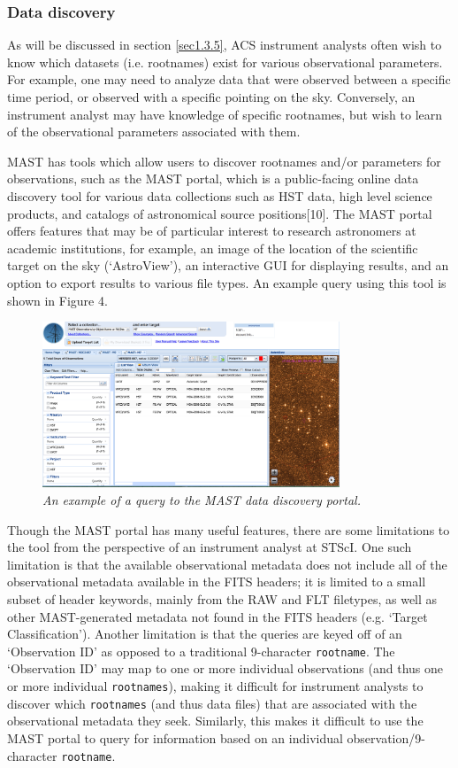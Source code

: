 \documentclass[10pt,journal,compsoc]{IEEEtran}
\begin{document}
\subsubsection{Data discovery} \label{sec1.3.4}

As will be discussed in section \ref{sec1.3.5}, ACS instrument analysts often wish to know which datasets (i.e. rootnames) exist for various observational parameters.
For example, one may need to analyze data that were observed between a specific time period, or observed with a specific pointing on the sky.  Conversely, an instrument analyst
may have knowledge of specific rootnames, but wish to learn of the observational parameters associated with them.

MAST has tools which allow users to discover rootnames and/or parameters for observations, such as the MAST portal, which is a public-facing online data discovery tool for
various data collections such as HST data, high level science products, and catalogs of astronomical source positions[10].  The MAST portal offers features that may be of particular
interest to research astronomers at academic institutions, for example, an image of the location of the scientific target on the sky (`AstroView'), an interactive GUI for displaying
results, and an option to export results to various file types.  An example query using this tool is shown in Figure 4.

\begin{figure}[!h]
\centering
\includegraphics[width=3.5in]{./figures/mast_portal.png}
\caption{\textit{An example of a query to the MAST data discovery portal.}}
\label{fig4}
\end{figure}

Though the MAST portal has many useful features, there are some limitations to the tool from the perspective of an instrument analyst at STScI.  One such limitation is that
the available observational metadata does not include all of the observational metadata available in the FITS headers; it is limited to a small subset of header keywords, mainly
from the RAW and FLT filetypes, as well as other MAST-generated metadata not found in the FITS headers (e.g. `Target Classification').  Another limitation is that the queries are
keyed off of an `Observation ID' as opposed to a traditional 9-character \texttt{rootname}.  The `Observation ID' may map to one or more individual observations (and thus one or more
individual \texttt{rootnames}), making it difficult for instrument analysts to discover which \texttt{rootnames} (and thus data files) that are associated with the observational
metadata they seek.  Similarly, this makes it difficult to use the MAST portal to query for information based on an individual observation/9-character \texttt{rootname}.
\end{document}
